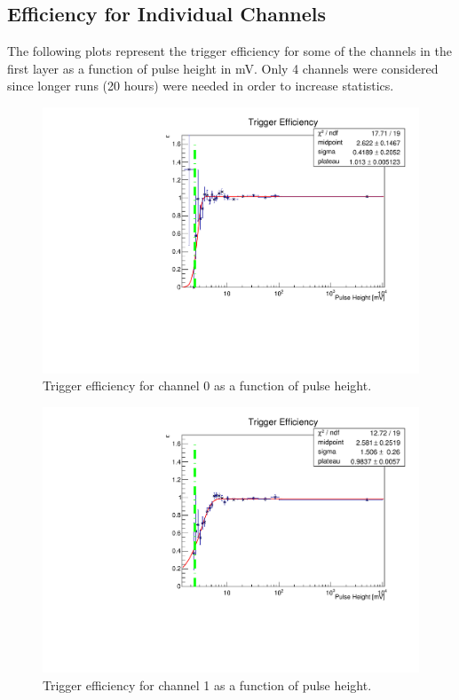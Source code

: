 \documentclass[12pt]{article}
\begin{document}
\subsection{ Efficiency for Individual Channels}
The following plots represent the trigger efficiency for some of the channels in the first layer as a function of pulse height in mV. Only 4 channels were considered since longer runs (20 hours) were needed in order to increase statistics. 

\begin{figure}[t!]
\centering
\centerline{\includegraphics[scale=0.5]{figures/triggerEfficiency/Efficiency_Run2276_TC_CH0_Height_Eff_vs_Run2277_DC_CH0_Height_Eff}}
{\caption{ Trigger efficiency for channel 0 as a function of pulse height.  }

\label{fig:ch0}
}
\end{figure}

\begin{figure}[b!]
\centering
\centerline{\includegraphics[scale=0.5]{figures/triggerEfficiency/Efficiency_Run2278_TC_CH1_Height_Eff_vs_Run2277_DC_CH1_Height_Eff}}
{\caption{ Trigger efficiency for channel 1 as a function of pulse height.  }

\label{fig:ch1}
}
\end{figure}
\end{document}
